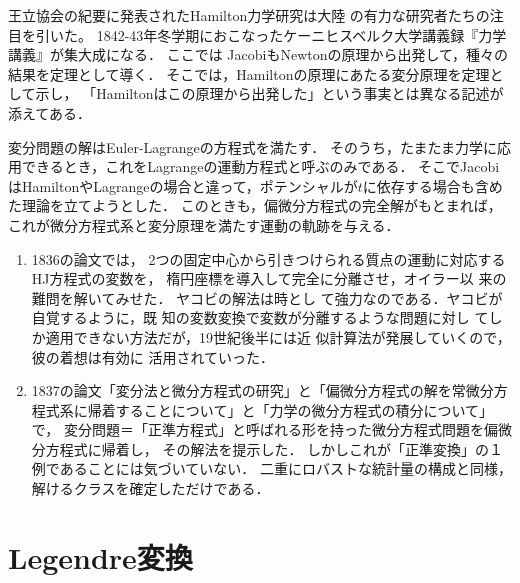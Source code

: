 \documentclass[uplatex, dvipdfmx]{jsreport}
\begin{document}
\begin{history}
    王立協会の紀要に発表されたHamilton力学研究は大陸
    の有力な研究者たちの注目を引いた。
    1842-43年冬学期におこなったケーニヒスベルク大学講義録『力学講義』が集大成になる．
    ここでは
    JacobiもNewtonの原理から出発して，種々の結果を定理として導く．
    そこでは，Hamiltonの原理にあたる変分原理を定理として示し，
    「Hamiltonはこの原理から出発した」という事実とは異なる記述が添えてある．
\end{history}

\begin{history}
    変分問題の解はEuler-Lagrangeの方程式を満たす．
    そのうち，たまたま力学に応用できるとき，これをLagrangeの運動方程式と呼ぶのみである．
    そこでJacobiはHamiltonやLagrangeの場合と違って，ポテンシャルが$t$に依存する場合も含めた理論を立てようとした．
    このときも，偏微分方程式の完全解がもとまれば，これが微分方程式系と変分原理を満たす運動の軌跡を与える．
\end{history}

\begin{history}[偏微分方程式の解法理論への貢献]\mbox{}
    \begin{enumerate}
        \item 1836の論文\cite{Jacobi36}では，
        2つの固定中心から引きつけられる質点の運動に対応するHJ方程式の変数を，
        楕円座標を導入して完全に分離させ，オイラー以
        来の難問を解いてみせた．
        ヤコビの解法は時とし
        て強力なのである．ヤコビが自覚するように，既
        知の変数変換で変数が分離するような問題に対し
        てしか適用できない方法だが，19世紀後半には近
        似計算法が発展していくので，彼の着想は有効に
        活用されていった．
        \item 1837の論文\cite{Jacobi37}「変分法と微分方程式の研究」と「偏微分方程式の解を常微分方程式系に帰着することについて」と「力学の微分方程式の積分について」で，
        変分問題＝「正準方程式」と呼ばれる形を持った微分方程式問題を偏微分方程式に帰着し，
        その解法を提示した．
        しかしこれが「正準変換」の１例であることには気づいていない．
        二重にロバストな統計量の構成と同様，解けるクラスを確定しただけである．
    \end{enumerate}
\end{history}

\section{Legendre変換}
\end{document}
